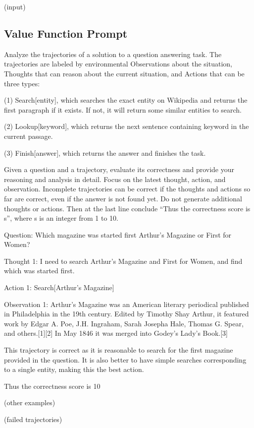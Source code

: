 {(input)

\subsection{Value Function Prompt}

Analyze the trajectories of a solution to a question answering task. The trajectories are labeled by environmental Observations about the situation, Thoughts that can reason about the current situation, and Actions that can be three types: 

(1) Search[entity], which searches the exact entity on Wikipedia and returns the first paragraph if it exists. If not, it will return some similar entities to search.

(2) Lookup[keyword], which returns the next sentence containing keyword in the current passage.

(3) Finish[answer], which returns the answer and finishes the task.

Given a question and a trajectory, evaluate its correctness and provide your reasoning and analysis in detail. Focus on the latest thought, action, and observation. Incomplete trajectories can be correct if the thoughts and actions so far are correct, even if the answer is not found yet. Do not generate additional thoughts or actions. Then at the last line conclude ``Thus the correctness score is {s}'', where s is an integer from 1 to 10.

Question: Which magazine was started first Arthur's Magazine or First for Women?

Thought 1: I need to search Arthur's Magazine and First for Women, and find which was started first.

Action 1: Search[Arthur's Magazine]

Observation 1: Arthur's Magazine was an American literary periodical published in Philadelphia in the 19th century. Edited by Timothy Shay Arthur, it featured work by Edgar A. Poe, J.H. Ingraham, Sarah Josepha Hale, Thomas G. Spear, and others.[1][2] In May 1846 it was merged into Godey's Lady's Book.[3]

This trajectory is correct as it is reasonable to search for the first magazine provided in the question. It is also better to have simple searches corresponding to a single entity, making this the best action.

Thus the correctness score is 10

(other examples)

(failed trajectories)

}
